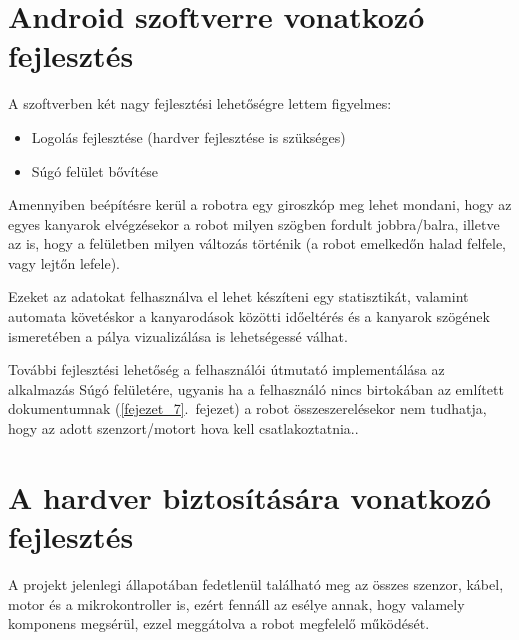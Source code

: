 \documentclass[]{thesis-ekf}
\theoremstyle{definition}
\begin{document}
\section{Android szoftverre vonatkozó fejlesztés}
A szoftverben két nagy fejlesztési lehetőségre lettem figyelmes:
\begin{itemize}
	\item Logolás fejlesztése (hardver fejlesztése is szükséges)
	\item Súgó felület bővítése
\end{itemize}
Amennyiben beépítésre kerül a robotra egy giroszkóp meg lehet mondani, hogy az egyes kanyarok elvégzésekor a robot milyen szögben fordult jobbra/balra, illetve az is, hogy a felületben milyen változás történik (a robot emelkedőn halad felfele, vagy lejtőn lefele).

Ezeket az adatokat felhasználva el lehet készíteni egy statisztikát, valamint automata követéskor a kanyarodások közötti időeltérés és a kanyarok szögének ismeretében a pálya vizualizálása is lehetségessé válhat.

További fejlesztési lehetőség a felhasználói útmutató implementálása az alkalmazás Súgó felületére, ugyanis ha a felhasználó nincs birtokában az említett dokumentumnak (\ref{fejezet_7}.~fejezet) a robot összeszerelésekor nem tudhatja, hogy az adott szenzort/motort hova kell csatlakoztatnia..
\section{A hardver biztosítására vonatkozó fejlesztés}
A projekt jelenlegi állapotában fedetlenül található meg az összes szenzor, kábel, motor és a mikrokontroller is, ezért fennáll az esélye annak, hogy valamely komponens megsérül, ezzel meggátolva a robot megfelelő működését.
\end{document}
